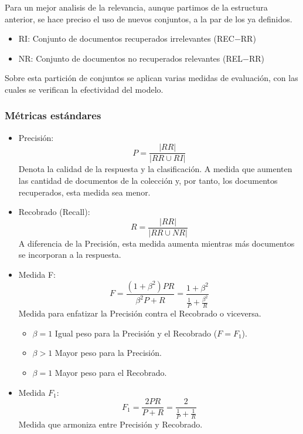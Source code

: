 Para un mejor analisis de la relevancia, aunque partimos de la estructura
anterior, se hace preciso el uso de nuevos conjuntos, a la par de los ya
definidos.

\begin{itemize}
    \item RI: Conjunto de documentos recuperados irrelevantes (REC$-$RR)
    \item NR: Conjunto de documentos no recuperados relevantes (REL$-$RR)
\end{itemize}

Sobre esta partición de conjuntos se aplican varias medidas de evaluación, con
las cuales se verifican la efectividad del modelo.

\subsubsection{Métricas estándares}



\begin{itemize}
\item Precisión:
    $$P = \dfrac{|RR|}{|RR \cup RI|}$$
    Denota la calidad de la respuesta y la clasificación. A medida que aumenten
    las cantidad de documentos de la colección y, por tanto, los documentos
    recuperados, esta medida sea menor.\\
\item Recobrado (Recall):
    $$R = \dfrac{|RR|}{|RR \cup NR|}$$
    A diferencia de la Precisión, esta medida aumenta mientras más documentos
    se incorporan a la respuesta.\\
\item Medida F:
    $$F = \dfrac{(1+\beta^2)PR}{\beta^2P+R} = \dfrac{1+\beta^2}{\frac{1}{P}+
    \frac{\beta^2}{R}}$$
    Medida para enfatizar la Precisión contra el Recobrado o viceversa.
    \begin{itemize}
    \item $\beta =1$ Igual peso para la Precisión y el Recobrado ($F=F_1$).
    \item $\beta >1$ Mayor peso para la Precisión.
    \item $\beta =1$ Mayor peso para el Recobrado.\\
    \end{itemize}
\item Medida $F_1$:
    $$F_1 = \dfrac{2PR}{P+R} = \dfrac{2}{\frac{1}{P} + \frac{1}{R}}$$
    Medida que armoniza entre Precisión y Recobrado.
\end{itemize}

